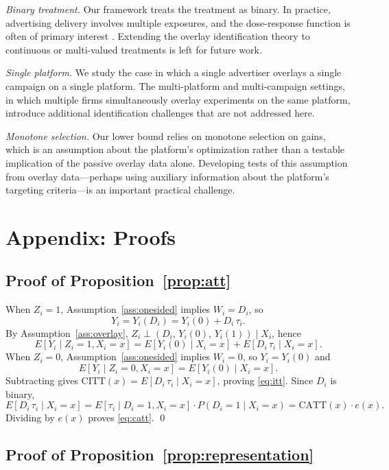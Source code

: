 \documentclass[11pt]{article}
\begin{document}
\emph{Binary treatment.}  Our framework treats the treatment as binary.  In
practice, advertising delivery involves multiple exposures, and the dose-response
function is often of primary interest \citep{blake2015consumer}.  Extending the
overlay identification theory to continuous or multi-valued treatments is left
for future work.

\emph{Single platform.}  We study the case in which a single advertiser overlays
a single campaign on a single platform.  The multi-platform and multi-campaign
settings, in which multiple firms simultaneously overlay experiments on the same
platform, introduce additional identification challenges that are not addressed
here.

\emph{Monotone selection.}  Our lower bound relies on monotone selection on
gains, which is an assumption about the platform's optimization rather than a
testable implication of the passive overlay data alone.  Developing tests of
this assumption from overlay data---perhaps using auxiliary information about the
platform's targeting criteria---is an important practical challenge.

\appendix
\renewcommand{\thesection}{A}
\section*{Appendix: Proofs}

\subsection*{Proof of Proposition~\ref{prop:att}}

When $Z_i = 1$, Assumption~\ref{ass:onesided} implies $W_i = D_i$, so
\[
  Y_i = Y_i(D_i) = Y_i(0) + D_i\,\tau_i.
\]
By Assumption~\ref{ass:overlay}, $Z_i \perp (D_i,\, Y_i(0),\, Y_i(1)) \mid X_i$, hence
\[
  E[Y_i \mid Z_i=1, X_i=x] = E[Y_i(0) \mid X_i=x] + E[D_i\,\tau_i \mid X_i=x].
\]
When $Z_i = 0$, Assumption~\ref{ass:onesided} implies $W_i = 0$, so $Y_i =
Y_i(0)$ and
\[
  E[Y_i \mid Z_i=0, X_i=x] = E[Y_i(0) \mid X_i=x].
\]
Subtracting gives $\mathrm{CITT}(x) = E[D_i\,\tau_i \mid X_i=x]$, proving
\eqref{eq:itt}.  Since $D_i$ is binary,
\[
  E[D_i\,\tau_i \mid X_i=x] = E[\tau_i \mid D_i=1, X_i=x]\cdot P(D_i=1 \mid X_i=x)
  = \mathrm{CATT}(x)\cdot e(x).
\]
Dividing by $e(x)$ proves \eqref{eq:catt}. \qed

\subsection*{Proof of Proposition~\ref{prop:representation}}
\end{document}
